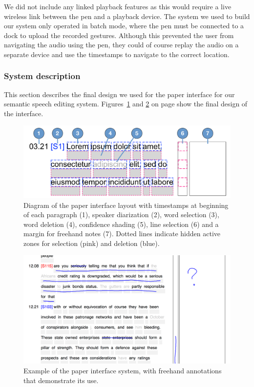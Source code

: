 We did not include any linked playback features as this would require a live wireless link between the pen and a
playback device. The system we used to build our system only operated in batch mode, where the pen must be
connected to a dock to upload the recorded gestures. Although this prevented the user from navigating the audio using
the pen, they could of course replay the audio on a separate device and use the timestamps to navigate to the correct
location.

\subsubsection{System description}

This section describes the final design we used for the paper interface for our semantic speech editing system.
Figures~\ref{fig:paper-interface-diagram} and \ref{fig:paper-interface-example} on page
\pageref{fig:paper-interface-diagram} show the final design of the interface.

\begin{figure}[p]
  \centering
  \includegraphics[width=\columnwidth]{figs/paper-interface-diagram.pdf}
  \caption{Diagram of the paper interface layout with timestamps at beginning of each paragraph (1), speaker
  diarization (2), word selection (3), word deletion (4), confidence shading (5), line selection (6) and a margin for
  freehand notes (7). Dotted lines indicate hidden active zones for selection (pink) and deletion (blue).}
  \label{fig:paper-interface-diagram}
\end{figure}

\begin{figure}[p]
  \centering
  \includegraphics[width=\columnwidth]{figs/paper-interface-example-annotations.png}
  \caption{Example of the paper interface system, with freehand annotations that demonstrate its use.}
  \label{fig:paper-interface-example}
\end{figure}

